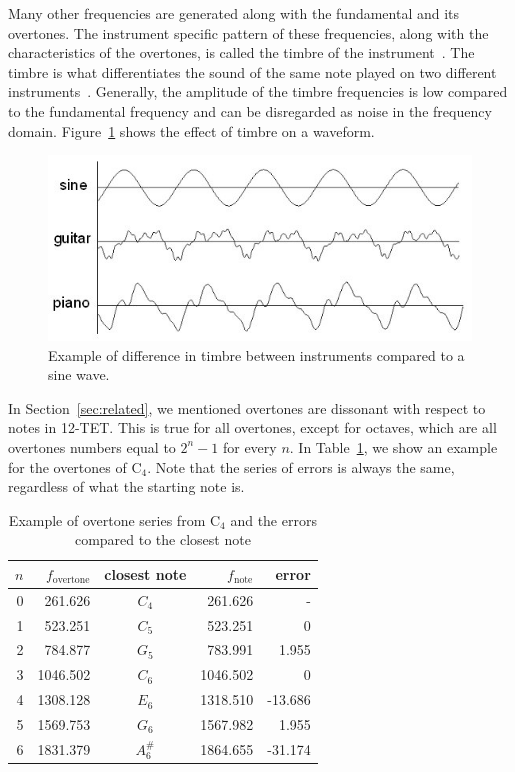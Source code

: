 \documentclass[10pt,twocolumn]{article}
\newcommand{\note}[2]{#1${}_{#2}$}
\begin{document}
Many other frequencies are generated along with the fundamental and its overtones. The instrument specific pattern of these frequencies, along with the characteristics of the overtones, is called the timbre of the instrument~\cite{timbre}. The timbre is what differentiates the sound of the same note played on two different instruments~\cite{perception}. Generally, the amplitude of the timbre frequencies is low compared to the fundamental frequency and can be disregarded as noise in the frequency domain. Figure~\ref{fig:timbre} shows the effect of timbre on a waveform.
\begin{figure}[h]
    \centering
    \includegraphics[width=\linewidth]{fig/timbre.jpg}
    \caption{Example of difference in timbre between instruments compared to a sine wave.}
    \label{fig:timbre}
\end{figure}

In Section~\ref{sec:related}, we mentioned overtones are dissonant with respect to notes in 12-TET. This is true for all overtones, except for octaves, which are all overtones numbers equal to $2^n - 1$ for every $n$. In Table~\ref{tab:overseries}, we show an example for the overtones of \note{C}{4}. Note that the series of errors is always the same, regardless of what the starting note is. 
\begin{table}[H]
    \centering
    \begin{tabular}{rrcrr}
        $n$ & $f_{\text{overtone}}$ & closest note & $f_\text{note}$ & error \\
        \hline
        0 & 261.626  & $C_4$    & 261.626  &  - \\
        1 & 523.251  & $C_5$    & 523.251  &  0 \\
        2 & 784.877  & $G_5$    & 783.991  &  1.955 \\
        3 & 1046.502 & $C_6$    & 1046.502 &  0 \\
        4 & 1308.128 & $E_6$    & 1318.510 &  -13.686 \\
        5 & 1569.753 & $G_6$    & 1567.982 &  1.955 \\
        6 & 1831.379 & $A^\#_6$ & 1864.655 &  -31.174
    \end{tabular}
    \caption{Example of overtone series from \note{C}{4} and the errors compared to the closest note}
    \label{tab:overseries}
\end{table}
\end{document}
